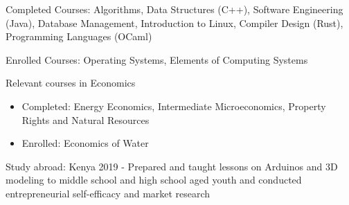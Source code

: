 \begin{cventries}
{\begin{cvitems}
\begin{itemize}
        \end{itemize}
    \else
    \item {Completed Courses: Algorithms, Data Structures (C++), Software
    Engineering (Java), Database Management, Introduction to Linux, Compiler Design (Rust), Programming Languages (OCaml)}
    \item {Enrolled Courses: Operating Systems, Elements of Computing Systems}
    \fi
        \ifcv
        \item {Relevant courses in Economics}
        \begin{itemize}
          \item Completed: Energy Economics, Intermediate Microeconomics, Property Rights and Natural Resources
          \item Enrolled: Economics of Water
        \end{itemize}
        \fi
    \ifcv
\item {Study abroad: Kenya 2019 - Prepared and taught lessons on Arduinos and 3D modeling to
middle school and high school aged youth and conducted entrepreneurial self-efficacy and market research }
\fi
      \end{cvitems}
    }
    {}
\end{cventries}